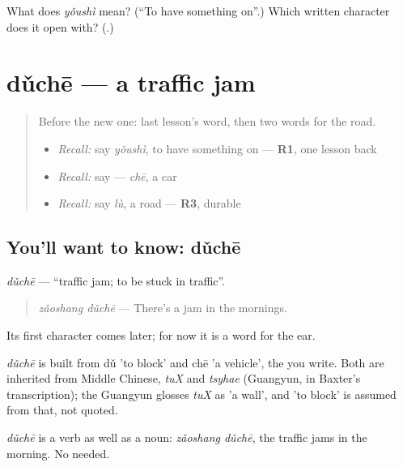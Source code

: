 \begin{tcolorbox}[breakable,colback=teal!4,colframe=teal!35!black,title={Before you move on}]
What does \emph{yǒushì} mean? (\textquotedblleft{}To have something on\textquotedblright{}.) Which written character does it open with? (\textbf{}.)
\end{tcolorbox}
\section[dǔchē]{dǔchē — a traffic jam}

\label{lesson:ZH-C95-duche}



\begin{quote}
Before the new one: last lesson's word, then two words for the road.

\begin{itemize}
\raggedright
  \item \emph{Recall:} say \emph{yǒushì}, to have something on — \textbf{R1}, one lesson back
  \item \emph{Recall:} say  — \emph{chē}, a car
  \item \emph{Recall:} say \emph{lù}, a road — \textbf{R3}, durable
\end{itemize}
\end{quote}

\subsection*{You'll want to know: dǔchē}
\emph{dǔchē} — \textquotedblleft{}traffic jam; to be stuck in traffic\textquotedblright{}.

\begin{quote}
\emph{zǎoshang dǔchē} — There's a jam in the mornings.
\end{quote}

Its first character comes later; for now it is a word for the ear.

\begin{cousinweb}
\emph{dǔchē} is built from dǔ 'to block' and chē 'a vehicle', the  you write. Both are inherited from Middle Chinese, \emph{tuX} and \emph{tsyhae} (Guangyun, in Baxter's transcription); the Guangyun glosses \emph{tuX} as 'a wall', and 'to block' is assumed from that, not quoted.
\end{cousinweb}

\begin{grammarlens}[title={What you've built}]
\emph{dǔchē} is a verb as well as a noun: \emph{zǎoshang dǔchē}, the traffic jams in the morning. No  needed.
\end{grammarlens}

